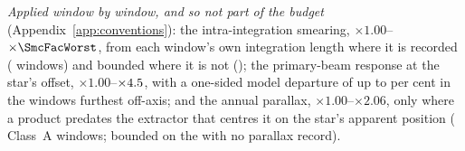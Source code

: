 \par\smallskip\raggedright\emph{Applied window by window, and so not part of the budget} (Appendix~\ref{app:conventions}): the intra-integration smearing, $\times1.00$--$\times\SmcFacWorst$, from each window's own integration length where it is recorded (\SmcNMeas{} windows) and bounded where it is not (\SmcNBound); the primary-beam response at the star's offset, $\times1.00$--$\times4.5$, with a one-sided model departure of up to \BmModelMaxPct{} per cent in the \BmNAboveTenPct{} windows furthest off-axis; and the annual parallax, $\times1.00$--$\times2.06$, only where a product predates the extractor that centres it on the star's apparent position (\PxaNWinARet{} Class~A windows; bounded on the \PxaNMissing{} with no parallax record).
